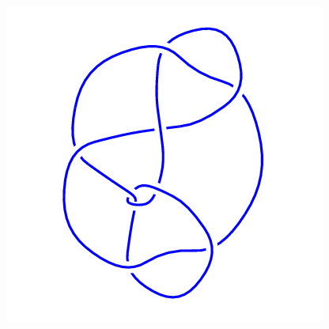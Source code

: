 \begin{figure}[H]
\begin{minipage}[b]{.18\linewidth}
    \end{minipage}
    \begin{minipage}[b]{.18\linewidth}
        \centering
        \includegraphics[width=\linewidth]{../data/9_45.png}
    \end{minipage}
\end{figure}
